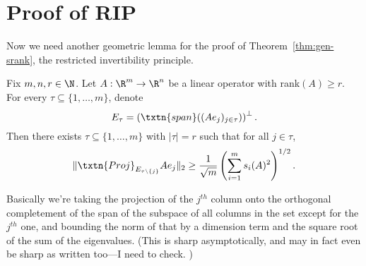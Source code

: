 
\section{Proof of RIP}

Now we need another geometric lemma for the proof of %
Theorem~\ref{thm:gen-srank}, the restricted invertibility principle. 

\begin{lem}[Step 1] 
Fix $m, n, r \in \N$. Let $A: \R^m \to \R^n$ be a linear operator with rank$(A) \geq r$. For every $\tau \subseteq \{1, \ldots, m\}$, denote
\[
E_{\tau} = \left(\txtn{span}((Ae_j)_{j \in \tau})\right)^{\perp}.
\] 
Then there exists $\tau \subseteq \{1, \ldots, m\}$ with $|\tau| = r$ such that for all $j \in \tau$, 
\[
\|\txtn{Proj}_{E_{\tau \setminus \{j\}}} Ae_j\|_2 \geq \frac{1}{\sqrt{m}}\left(\sum_{i = 1}^m s_i(A)^2\right)^{1/2}.
\]
\end{lem}
Basically we're taking the projection of the $j^{th}$ column onto the orthogonal completement of the span of the subspace of all columns in the set except for the $j^{th}$ one, and bounding the norm of that by a dimension term and the square root of the sum of the eigenvalues. 
(This is sharp asymptotically, and may in fact even be sharp as written too---I need to check. )


